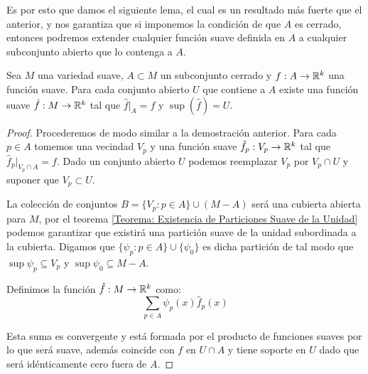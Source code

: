 Es por esto que damos el siguiente lema, el cual es un resultado más fuerte que el anterior, y nos garantiza que si imponemos la condición de que $A$ es cerrado, entonces podremos extender cualquier función suave definida en $A$ a cualquier subconjunto abierto que lo contenga a $A$.


\begin{lemma}\label{Lemma: Lema de Extensión para Funciones Suaves}
	Sea $M$ una variedad suave, $A \subset M$ un subconjunto cerrado y $f: A \to \mathbb{R}^k$ una función suave. Para cada conjunto abierto $U$ que contiene a $A$ existe una función suave $\hat{f}: M \to \mathbb{R}^{k}$ tal que $\hat{f}|_{A} = f$ y $\sup(\hat{f}) = U$.
\end{lemma}

\begin{proof}
	Procederemos de modo similar a la demostración anterior. Para cada $p \in A$ tomemos una vecindad $V_p$ y una función suave $\hat{f}_p: V_p \to \mathbb{R}^k$ tal que $\hat{f}_p|_{V_p \cap A} = f$. Dado un conjunto abierto $U$ podemos reemplazar $V_p$ por $V_p \cap U$ y suponer que $V_p \subset U$.

	La colección de conjuntos $B=\{V_p: p \in A\} \cup (M - A)$ será una cubierta abierta para $M$, por el teorema \ref{Teorema: Existencia de Particiones Suave de la Unidad} podemos garantizar que existirá una partición suave de la unidad subordinada a la cubierta. Digamos que $\{\psi_p: p \in A\} \cup \{\psi_0 \}$ es dicha partición de tal modo que $\sup \psi_p \subseteq V_p$ y $\sup \psi_0 \subseteq M - A$.

	Definimos la función $\hat{f}: M \to \mathbb{R}^k$ como:
	\[
		\sum_{p \in A} \psi_p(x)\hat{f}_p(x)
	\]

	Esta suma es convergente y está formada por el producto de funciones suaves por lo que será suave, además coincide con $f$ en $U \cap A$ y tiene soporte en $U$ dado que será idénticamente cero fuera de $A$.
\end{proof}
